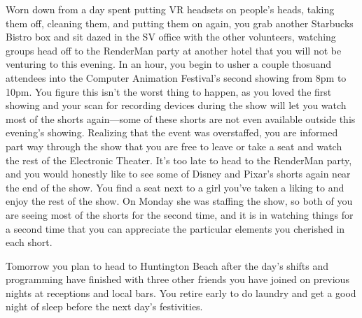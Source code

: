 \documentclass[../main.tex]{subfiles}
\begin{document}
Worn down from a day spent putting VR headsets on people's heads, taking them off, cleaning them, and putting them on again, you grab another Starbucks Bistro box and sit dazed in the SV office with the other volunteers, watching groups head off to the RenderMan party at another hotel that you will not be venturing to this evening. In an hour, you begin to usher a couple thosuand attendees into the Computer Animation Festival's second showing from 8pm to 10pm. You figure this isn't the worst thing to happen, as you loved the first showing and your scan for recording devices during the show will let you watch most of the shorts again---some of these shorts are not even available outside this evening's showing. Realizing that the event was overstaffed, you are informed part way through the show that you are free to leave or take a seat and watch the rest of the Electronic Theater. It's too late to head to the RenderMan party, and you would honestly like to see some of Disney and Pixar's shorts again near the end of the show. You find a seat next to a girl you've taken a liking to and enjoy the rest of the show. On Monday she was staffing the show, so both of you are seeing most of the shorts for the second time, and it is in watching things for a second time that you can appreciate the particular elements you cherished in each short.

Tomorrow you plan to head to Huntington Beach after the day's shifts and programming have finished with three other friends you have joined on previous nights at receptions and local bars. You retire early to do laundry and get a good night of sleep before the next day's festivities.
\end{document}

